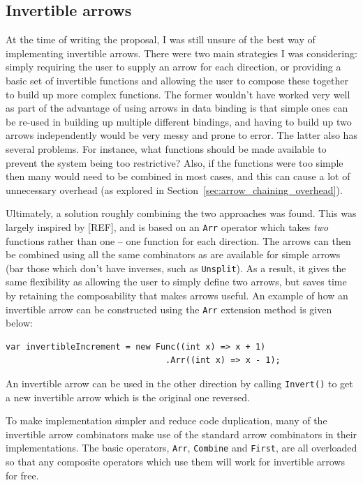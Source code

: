 \documentclass[12pt,twoside,notitlepage]{report}
\begin{document}
\subsection{Invertible arrows}

At the time of writing the proposal, I was still unsure of the best way of implementing invertible arrows. There were two main strategies I was considering: simply requiring the user to supply an arrow for each direction, or providing a basic set of invertible functions and allowing the user to compose these together to build up more complex functions. The former wouldn't have worked very well as part of the advantage of using arrows in data binding is that simple ones can be re-used in building up multiple different bindings, and having to build up two arrows independently would be very messy and prone to error. The latter also has several problems. For instance, what functions should be made available to prevent the system being too restrictive? Also, if the functions were too simple then many would need to be combined in most cases, and this can cause a lot of unnecessary overhead (as explored in Section~\ref{sec:arrow_chaining_overhead}).

Ultimately, a solution roughly combining the two approaches was found. This was largely inspired by [REF], and is based on an \texttt{Arr} operator which takes \textit{two} functions rather than one -- one function for each direction. The arrows can then be combined using all the same combinators as are available for simple arrows (bar those which don't have inverses, such as \texttt{Unsplit}). As a result, it gives the same flexibility as allowing the user to simply define two arrows, but saves time by retaining the composability that makes arrows useful. An example of how an invertible arrow can be constructed using the \texttt{Arr} extension method is given below:

\begin{lstlisting}[language={[Sharp]C}]
var invertibleIncrement = new Func((int x) => x + 1)
                                .Arr((int x) => x - 1);
\end{lstlisting}

An invertible arrow can be used in the other direction by calling \texttt{Invert()} to get a new invertible arrow which is the original one reversed.

To make implementation simpler and reduce code duplication, many of the invertible arrow combinators make use of the standard arrow combinators in their implementations. The basic operators, \texttt{Arr}, \texttt{Combine} and \texttt{First}, are all overloaded so that any composite operators which use them will work for invertible arrows for free.
\end{document}
